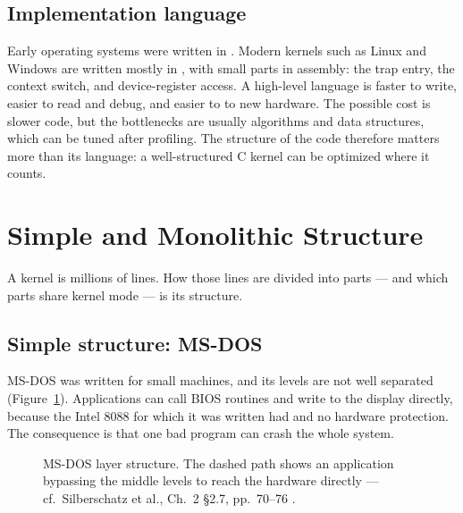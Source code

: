 \documentclass[11pt]{article}
\begin{document}
\subsection{Implementation language}

Early operating systems were written in . Modern kernels
such as Linux and Windows are written mostly in , with small parts in
assembly: the trap entry, the context switch, and device-register access. A
high-level language is faster to write, easier to read and debug, and easier to
 to new hardware. The possible cost is slower code, but the
bottlenecks are usually algorithms and data structures, which can be tuned
after profiling. The structure of the code therefore matters more than its
language: a well-structured C kernel can be optimized where it counts.

\section{Simple and Monolithic Structure}

\noindent{}

A kernel is millions of lines. How those lines are divided into parts --- and
which parts share kernel mode --- is its structure.

\subsection{Simple structure: MS-DOS}

MS-DOS was written for small machines, and its levels are not well separated
(Figure~\ref{fig:msdos}). Applications can call BIOS routines and write to the
display directly, because the Intel 8088 for which it was written had  and no hardware protection. The consequence is that one bad program
can crash the whole system.

\begin{figure}[h]
\centering
{}
\caption{MS-DOS layer structure. The dashed path shows an application bypassing
the middle levels to reach the hardware directly --- cf.\ Silberschatz et al.,
Ch.~2 \S2.7, pp.~70--76 \cite{SilberschatzOSC_operating_system_concepts}.}
\label{fig:msdos}
\end{figure}
\end{document}
